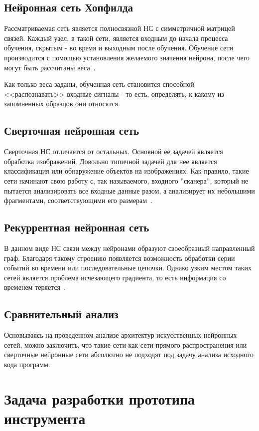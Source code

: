\subsection{Нейронная сеть Хопфилда}

Рассматриваемая сеть является полносвязной НС с симметричной матрицей связей. Каждый узел, в такой сети, является входным до начала процесса обучения, скрытым - во время и выходным после обучения. Обучение сети производится с помощью установления желаемого значения нейрона, после чего могут быть рассчитаны веса~\cite{hopfield}. 

Как только веса заданы, обученная сеть становится способной <<распознавать>> входные сигналы - то есть, определять, к какому из запомненных образцов они относятся.

\subsection{Сверточная нейронная сеть}

Сверточная НС отличается от остальных. Основной ее задачей является обработка изображений. Довольно типичной задачей для нее является классификация или обнаружение объектов на изображениях. Как правило, такие сети начинают свою работу с, так называемого, входного ''сканера'', который не пытается анализировать все входные данные разом, а анализирует их небольшими фрагментами, соответствующими его размерам~\cite{cnn}. 

\subsection{Рекуррентная нейронная сеть}

В данном виде НС связи между нейронами образуют своеобразный направленный граф. Благодаря такому строению появляется возможность обработки серии событий во времени или последовательные цепочки. Однако узким местом таких сетей является проблема исчезающего градиента, то есть информация со временем теряется~\cite{rnn}.

\subsection{Сравнительный анализ}

Основываясь на проведенном анализе архитектур искусственных нейронных сетей, можно заключить, что такие сети как сети прямого распространения или сверточные нейронные сети абсолютно не подходят под задачу анализа исходного кода программ.
\section{Задача разработки прототипа инструмента}

